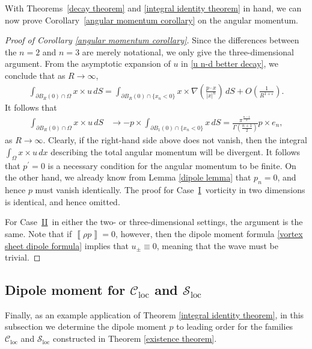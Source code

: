 \documentclass[11pt,reqno]{amsart}
\newcommand{\I}{\texorpdfstring{\hyperref[sec non-singular]{I}}{I}}
\newcommand{\VS}{\texorpdfstring{\hyperref[sec sheets]{II}}{II}}
\newcommand{\jump}[1]{\left\llbracket{#1}\right\rrbracket}
\theoremstyle{plain}
\theoremstyle{remark}
\numberwithin{equation}{section}
\begin{document}
With Theorems~\ref{decay theorem} and \ref{integral identity theorem} in hand, we can now prove Corollary~\ref{angular momentum corollary} on the angular momentum.
\begin{proof}[Proof of Corollary \ref{angular momentum corollary}]
  Since the differences between the $n=2$ and $n=3$ are merely notational, we only give the three-dimensional argument.
From the asymptotic expansion of $u$ in \eqref{u n-d better decay}, we 
conclude that as $R \to \infty$, 
\begin{align*}
  \int_{\partial B_R(0)  \cap \Omega} 
  x \times u\, dS
  = 
  \int_{\partial B_R(0) \cap \{x_n < 0\}}
  x \times \nabla \left(\frac {p\cdot x}{|x|^n}\right)\, dS + O\left( \frac{1}{R^{1+\varepsilon}}\right).
\end{align*}
It follows that
\begin{align*} 
  \int_{\partial B_R(0) \cap \Omega} x \times u \, dS &\to -p \times \int_{\partial B_1(0) \cap \{x_n < 0\}} x \, dS = \frac{\pi^{\frac{n-1}{2}}}{\Gamma(\frac{n+1}{2})} p \times e_n, 
\end{align*}
as $R \to \infty$. Clearly, if the right-hand side above does not vanish, then the integral 
\mbox{$\int_\Omega x \times u\, dx$}
describing the total angular momentum will be divergent.  It follows that $p^\prime = 0$ is a necessary condition for the angular momentum to be finite.  On the other hand, we already know from Lemma \ref{dipole lemma} that $p_n = 0$, and hence $p$ must vanish identically.  The proof for Case~\I\ vorticity in two dimensions is identical, and hence omitted.  

For Case~\VS\ in either the two- or three-dimensional settings, the argument is the same.  Note that if $\jump{\rho p} = 0$, however, then the dipole moment formula \eqref{vortex sheet dipole formula} implies that $u_\pm \equiv 0$, meaning that the wave must be trivial.
\end{proof}

\subsection{Dipole moment for \texorpdfstring{$\mathscr{C}_{\mathrm{loc}}$}{C\_loc} and \texorpdfstring{$\mathscr{S}_{\mathrm{loc}}$}{S\_loc}} 
\label{example section} Finally, as an example application of Theorem \ref{integral identity theorem}, in this subsection we determine the dipole moment $p$ to leading order for the families $\mathscr{C}_{\mathrm{loc}}$ and $\mathscr{S}_{\mathrm{loc}}$ constructed in Theorem \ref{existence theorem}.
\end{document}
